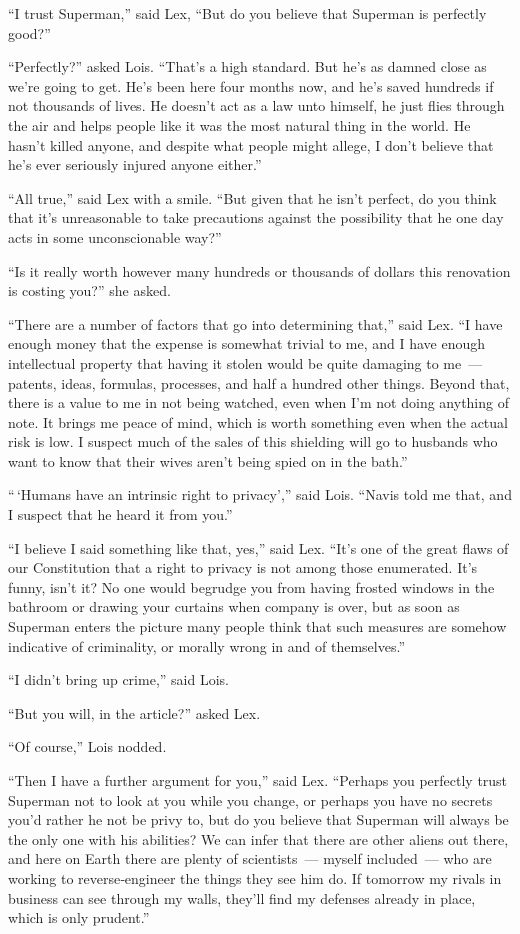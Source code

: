 \documentclass[ebook,12pt]{memoir}
\begin{document}
``I trust Superman,'' said Lex, ``But do you believe that Superman is
perfectly good?''

``Perfectly?'' asked Lois. ``That's a high standard. But he's as damned
close as we're going to get. He's been here four months now, and he's
saved hundreds if not thousands of lives. He doesn't act as a law unto
himself, he just flies through the air and helps people like it was the
most natural thing in the world. He hasn't killed anyone, and despite
what people might allege, I don't believe that he's ever seriously
injured anyone either.''

``All true,'' said Lex with a smile. ``But given that he isn't perfect,
do you think that it's unreasonable to take precautions against the
possibility that he one day acts in some unconscionable way?''

``Is it really worth however many hundreds or thousands of dollars this
renovation is costing you?'' she asked.

``There are a number of factors that go into determining that,'' said
Lex. ``I have enough money that the expense is somewhat trivial to me,
and I have enough intellectual property that having it stolen would be
quite damaging to me~--- patents, ideas, formulas, processes, and half a
hundred other things. Beyond that, there is a value to me in not being
watched, even when I'm not doing anything of note. It brings me peace of
mind, which is worth something even when the actual risk is low. I
suspect much of the sales of this shielding will go to husbands who want
to know that their wives aren't being spied on in the bath.''

``\,`Humans have an intrinsic right to privacy','' said Lois. ``Navis
told me that, and I suspect that he heard it from you.''

``I believe I said something like that, yes,'' said Lex. ``It's one of
the great flaws of our Constitution that a right to privacy is not among
those enumerated. It's funny, isn't it? No one would begrudge you from
having frosted windows in the bathroom or drawing your curtains when
company is over, but as soon as Superman enters the picture many people
think that such measures are somehow indicative of criminality, or
morally wrong in and of themselves.''

``I didn't bring up crime,'' said Lois.

``But you will, in the article?'' asked Lex.

``Of course,'' Lois nodded.

``Then I have a further argument for you,'' said Lex. ``Perhaps you
perfectly trust Superman not to look at you while you change, or perhaps
you have no secrets you'd rather he not be privy to, but do you believe
that Superman will always be the only one with his abilities? We can
infer that there are other aliens out there, and here on Earth there are
plenty of scientists~--- myself included~--- who are working to
reverse‐engineer the things they see him do. If tomorrow my rivals in
business can see through my walls, they'll find my defenses already in
place, which is only prudent.''
\end{document}
